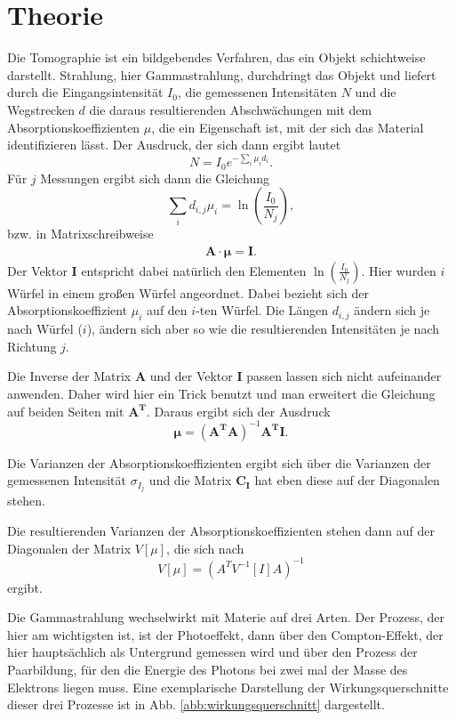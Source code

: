\section{Theorie}

Die Tomographie ist ein bildgebendes Verfahren, das ein Objekt schichtweise darstellt. Strahlung, hier Gammastrahlung, durchdringt das Objekt und liefert durch die Eingangsintensität $I_0$, die gemessenen Intensitäten $N$ und die Wegstrecken $d$ die daraus resultierenden Abschwächungen mit dem Absorptionskoeffizienten $\mu$, die ein Eigenschaft ist, mit der sich das Material identifizieren lässt. 
Der Ausdruck, der sich dann ergibt lautet
\begin{equation*}
    N = I_0 e^{- \sum_i \mu_i d_i}.
\end{equation*}
Für $j$ Messungen ergibt sich dann die Gleichung 
\begin{equation}\label{eq:linearKoeff}
    \sum_i d_{i,j} \mu_i = \ln \left( \frac{I_0}{N_j} \right),
\end{equation}
bzw. in Matrixschreibweise 
\begin{align}\label{eq:LGS_mu}
\mathbf{A} \cdot \mathbf{\mu} = \mathbf{I}.
\end{align}
Der Vektor $\mathbf{I}$ entspricht dabei natürlich den Elementen $\ln \left( \frac{I_0}{N_j} \right)$.
Hier wurden $i$ Würfel in einem großen Würfel angeordnet. Dabei bezieht sich der Absorptionskoeffizient $\mu_i$ auf den $i$-ten Würfel. Die Längen $d_{i,j}$ ändern sich je nach Würfel ($i$), ändern sich aber so wie die resultierenden Intensitäten je nach Richtung $j$.

Die Inverse der Matrix $\mathbf{A}$ und der Vektor $\mathbf{I}$ passen lassen sich nicht aufeinander anwenden. Daher wird hier ein Trick benutzt und man erweitert die Gleichung auf beiden Seiten mit $\mathbf{A^T}$. Daraus ergibt sich der Ausdruck 
\begin{equation*}
    \mathbf{\mu} = \left( \mathbf{A^T} \mathbf{A} \right)^{-1} \mathbf{A^T} \mathbf{I}.
\end{equation*}

Die Varianzen der Absorptionskoeffizienten ergibt sich über die Varianzen der gemessenen Intensität $\sigma_{I_j}$ und die Matrix $\mathbf{C_{I}}$ hat eben diese auf der Diagonalen stehen.

Die resultierenden Varianzen der Absorptionskoeffizienten stehen dann auf der Diagonalen der Matrix $V[\mu]$, die sich nach 
\begin{equation}\label{eq:kov}
    V[\mu] = \left(A^TV^{-1}[I]A\right)^{-1}
\end{equation}
ergibt.

Die Gammastrahlung wechselwirkt mit Materie auf drei Arten. Der Prozess, der hier am wichtigsten ist, ist der Photoeffekt, dann über den Compton-Effekt, der hier hauptsächlich als Untergrund gemessen wird und über den Prozess der Paarbildung, für den die Energie des Photons bei zwei mal der Masse des Elektrons liegen muss.  
Eine exemplarische Darstellung der Wirkungsquerschnitte dieser drei Prozesse ist in Abb. \ref{abb:wirkungsquerschnitt} dargestellt. 